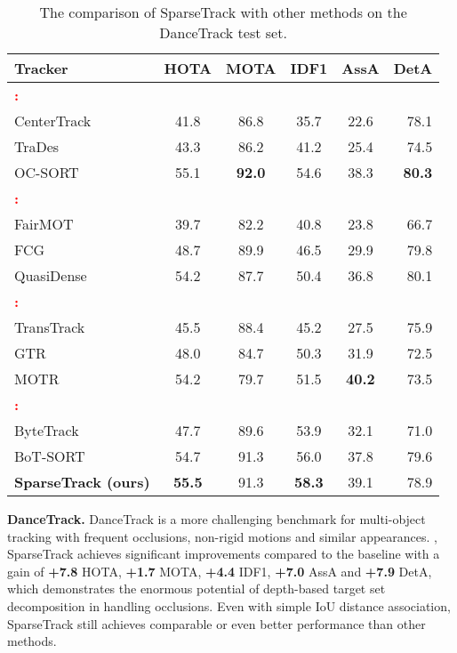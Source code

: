 \begin{table}[t]
\caption{The comparison of SparseTrack with other methods on the DanceTrack test set.}
\label{tab:dance}
\centering
\setlength{\tabcolsep}{1.0pt}
\begin{tabular}{ l | c c c c r}
\toprule
Tracker & HOTA & MOTA & IDF1 & AssA & DetA \\
\midrule
\textcolor{red}{\textbf{  :}}\\
CenterTrack\cite{centertrack} & 41.8 &  86.8 & 35.7 & 22.6 & 78.1\\
TraDes\cite{TraDeS}& 43.3 & 86.2 & 41.2 & 25.4 & 74.5\\
OC-SORT\cite{oc-sort} & 55.1 & \textbf{92.0} & 54.6 & 38.3 & \textbf{80.3}\\ 

\midrule
\textcolor{red}{\textbf{ :}}\\
FairMOT\cite{fairmot}  & 39.7 & 82.2 & 40.8 & 23.8 & 66.7 \\
FCG\cite{FCG} & 48.7 & 89.9 & 46.5 & 29.9 & 79.8 \\
QuasiDense\cite{qdtrack} & 54.2 & 87.7 & 50.4 & 36.8 & 80.1\\

\midrule
\textcolor{red}{\textbf{ :}}\\
TransTrack\cite{transtrack}   & 45.5 & 88.4 & 45.2 & 27.5 & 75.9 \\
GTR\cite{GTR} & 48.0 & 84.7 & 50.3 & 31.9 & 72.5\\
MOTR\cite{motr} & 54.2  & 79.7 & 51.5 & \textbf{40.2}& 73.5 \\

\midrule
\textcolor{red}{\textbf{  :}}\\
ByteTrack\cite{bytetrack} & 47.7 & 89.6 & 53.9 & 32.1 & 71.0 \\
BoT-SORT\cite{BoT-SORT} & 54.7 & 91.3 & 56.0 & 37.8 & 79.6 \\
\textbf{SparseTrack (ours)} & \textbf{55.5} & 91.3 & \textbf{58.3} & 39.1 & 78.9 \\
\bottomrule
\end{tabular}

\end{table}

\textbf{DanceTrack.} DanceTrack is a more challenging benchmark for multi-object tracking with frequent occlusions, non-rigid motions and similar appearances. , SparseTrack achieves significant improvements compared to the baseline with a gain of \textbf{+7.8} HOTA, \textbf{+1.7} MOTA, \textbf{+4.4} IDF1, \textbf{+7.0} AssA and \textbf{+7.9} DetA, which demonstrates the enormous potential of depth-based target set decomposition in handling occlusions. Even with simple IoU distance association, SparseTrack still achieves comparable or even better performance than other methods.

